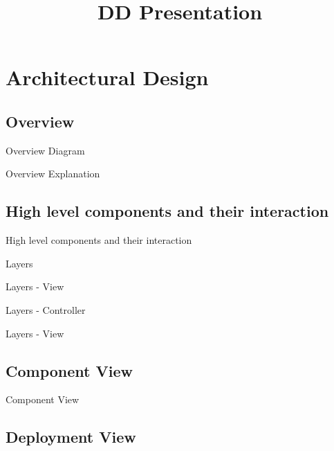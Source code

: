 \documentclass{../common/latex_classes/pdf_presentation}
\title{DD Presentation}
\begin{document}
	\titleToc{}
	\section{Architectural Design}
	
	\subsection{Overview}
	
	\begin{frame}{Overview Diagram}
	\end{frame}
	\begin{frame}{Overview Explanation}
		
	\end{frame}
	
	
	\subsection{High level components and their interaction}
	
	\begin{frame}{High level components and their interaction}
	\end{frame}
	
	\begin{frame}{Layers}
	\end{frame}
	
	\begin{frame}{Layers - View}
	\end{frame}
	
	\begin{frame}{Layers - Controller}
	\end{frame}
	
	\begin{frame}{Layers - View}
	\end{frame}
	
	\subsection{Component View}
	
	\begin{frame}{Component View}
	\end{frame}
	
	\subsection{Deployment View}
		
\end{document}
